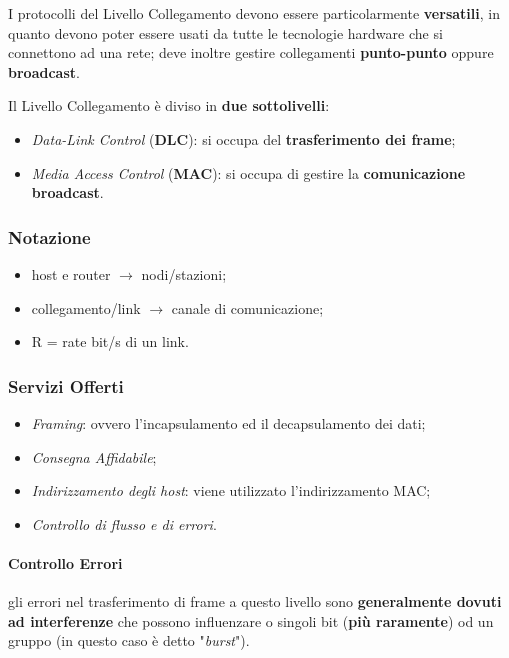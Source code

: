 \documentclass[a4paper]{article}
\begin{document}
			I protocolli del Livello Collegamento devono essere particolarmente \textbf{versatili}, in quanto devono poter essere usati da tutte le tecnologie hardware che si connettono ad una rete; deve inoltre gestire collegamenti \textbf{punto-punto} oppure \textbf{broadcast}.
			
			Il Livello Collegamento è diviso in \textbf{due sottolivelli}:
			\begin{itemize}
				\item \emph{Data-Link Control} (\textbf{DLC}): si occupa del \textbf{trasferimento dei frame};
				\item \emph{Media Access Control} (\textbf{MAC}): si occupa di gestire la \textbf{comunicazione broadcast}.
			\end{itemize}
			
			
			\subsubsection{Notazione}
				\begin{itemize}
					\item host e router $ \rightarrow $ nodi/stazioni;
					\item collegamento/link $ \rightarrow $ canale di comunicazione;
					\item R = rate bit/s di un link.
				\end{itemize}
			
			
			\subsubsection{Servizi Offerti}
				\begin{itemize}
					\item \emph{Framing}: ovvero l'incapsulamento ed il decapsulamento dei dati;
					\item \emph{Consegna Affidabile};
					\item \emph{Indirizzamento degli host}: viene utilizzato l'indirizzamento MAC;
					\item \emph{Controllo di flusso e di errori}. 
				\end{itemize}
				
				\paragraph{Controllo Errori}
					gli errori nel trasferimento di frame a questo livello sono \textbf{generalmente dovuti ad interferenze} che possono influenzare o singoli bit (\textbf{più raramente}) od un gruppo (in questo caso è detto "\emph{burst}").
					
\end{document}
